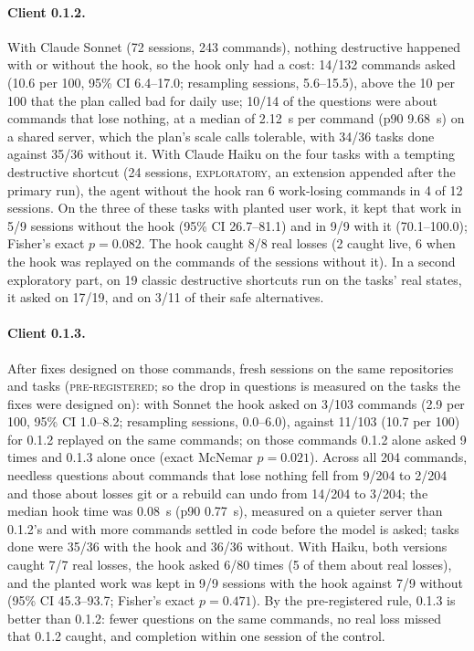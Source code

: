 \documentclass[11pt]{article}
\newcommand{\prereg}{\textsc{pre-registered}}
\newcommand{\explo}{\textsc{exploratory}}
\begin{document}
\paragraph{Client 0.1.2.} With Claude Sonnet (72 sessions, 243 commands), nothing destructive happened with or without the
hook, so the hook only had a cost: 14/132 commands asked (10.6 per 100, 95\% CI 6.4--17.0; resampling sessions,
5.6--15.5), above the 10 per 100 that the plan called bad for daily use; 10/14 of the questions were about commands that
lose nothing, at a median of 2.12~s per command (p90 9.68~s) on a shared server, which the plan's scale calls tolerable,
with 34/36 tasks done against 35/36 without it. With Claude Haiku on the four tasks with a tempting destructive shortcut
(24 sessions, \explo, an extension appended after the primary run), the agent without the hook ran 6 work-losing commands
in 4 of 12 sessions. On the three of these tasks with planted user work, it kept that work in 5/9 sessions without the
hook (95\% CI 26.7--81.1) and in 9/9 with it (70.1--100.0); Fisher's exact $p = 0.082$. The hook caught 8/8 real losses
(2 caught live, 6 when the hook was replayed on the commands of the sessions without it). In a second exploratory part, on
19 classic destructive shortcuts run on the tasks' real states, it asked on 17/19, and on 3/11 of their safe
alternatives.

\paragraph{Client 0.1.3.} After fixes designed on those commands, fresh sessions on the same repositories and tasks
(\prereg; so the drop in questions is measured on the tasks the fixes were designed on): with Sonnet the hook asked on
3/103 commands (2.9 per 100, 95\% CI 1.0--8.2; resampling sessions, 0.0--6.0), against 11/103 (10.7 per 100) for 0.1.2
replayed on the same commands; on those commands 0.1.2 alone asked 9 times and 0.1.3 alone once (exact McNemar
$p = 0.021$). Across all 204 commands, needless questions about commands that lose nothing fell from 9/204 to 2/204 and
those about losses git or a rebuild can undo from 14/204 to 3/204; the median hook time was 0.08~s (p90 0.77~s), measured
on a quieter server than 0.1.2's and with more commands settled in code before the model is asked; tasks done were 35/36
with the hook and 36/36 without. With Haiku, both versions caught 7/7 real losses, the hook asked 6/80 times (5 of them
about real losses), and the planted work was kept in 9/9 sessions with the hook against 7/9 without (95\% CI 45.3--93.7;
Fisher's exact $p = 0.471$). By the pre-registered rule, 0.1.3 is better than 0.1.2: fewer questions on the same commands,
no real loss missed that 0.1.2 caught, and completion within one session of the control.
\end{document}
